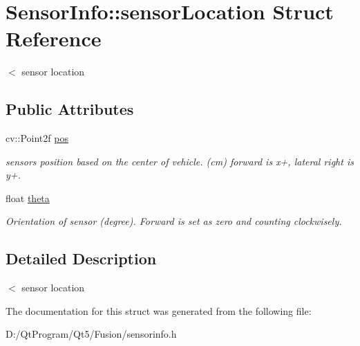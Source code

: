 \hypertarget{struct_sensor_info_1_1sensor_location}{}\section{Sensor\+Info\+:\+:sensor\+Location Struct Reference}
\label{struct_sensor_info_1_1sensor_location}


$<$ sensor location  


\subsection*{Public Attributes}
\begin{DoxyCompactItemize}
\item 
\hypertarget{struct_sensor_info_1_1sensor_location_a4d2b0de0df1d6fe27e59abd43b6188e7}{}cv\+::\+Point2f \hyperlink{struct_sensor_info_1_1sensor_location_a4d2b0de0df1d6fe27e59abd43b6188e7}{pos}\label{struct_sensor_info_1_1sensor_location_a4d2b0de0df1d6fe27e59abd43b6188e7}

\begin{DoxyCompactList}\small\item\em sensor\textquotesingle{}s position based on the center of vehicle. (cm) forward is x+, lateral right is y+. \end{DoxyCompactList}\item 
\hypertarget{struct_sensor_info_1_1sensor_location_af7e8875d3d2f607d45ec8c2d3183b872}{}float \hyperlink{struct_sensor_info_1_1sensor_location_af7e8875d3d2f607d45ec8c2d3183b872}{theta}\label{struct_sensor_info_1_1sensor_location_af7e8875d3d2f607d45ec8c2d3183b872}

\begin{DoxyCompactList}\small\item\em Orientation of sensor (degree). Forward is set as zero and counting clockwisely. \end{DoxyCompactList}\end{DoxyCompactItemize}


\subsection{Detailed Description}
$<$ sensor location 

The documentation for this struct was generated from the following file\+:\begin{DoxyCompactItemize}
\item 
D\+:/\+Qt\+Program/\+Qt5/\+Fusion/sensorinfo.\+h\end{DoxyCompactItemize}
